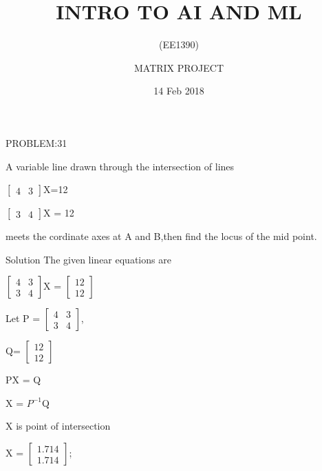 \documentclass{beamer}
\title{INTRO TO AI AND ML}
\subtitle{(EE1390)}
\author{MATRIX PROJECT}
\date{14 Feb 2018}
\institute{G.NAGA DHANUSH , EE17BTECH11014 \and B.GOWRI SHANKAR REDDY , EE17BTECH11009}
\begin{document}
\begin{frame}
	
	\titlepage
	
\end{frame}

\begin{frame}[t] {PROBLEM:31}

A variable line drawn through the intersection of lines


   
    $\begin{bmatrix}
    4 & 3
    \end{bmatrix}$X=12


    $
    \begin{bmatrix}
    3 & 4
    \end{bmatrix} $X  = 12
    
meets the cordinate axes at A and B,then find the locus of the mid point.

\end{frame}

\begin{frame}{Solution}
The given linear equations are


$
\begin{bmatrix}
    4 & 3 \\
    3 & 4
\end{bmatrix}
$X =    
     $\begin{bmatrix}
    12 \\
    12
    \end{bmatrix}$ 
    
Let P =   
 $\begin{bmatrix}
   4 & 3 \\
   3 & 4
    \end{bmatrix}$,
        
    Q= $\begin{bmatrix}
    12 \\ 
    12
   
    \end{bmatrix}$    

PX = Q

X = $P^{-1}$Q

X is point of intersection

X =
 $  
\begin{bmatrix}
  
1.714 \\
1.714
\end{bmatrix}
$;
    
    

    
\end{frame}
\end{document}
